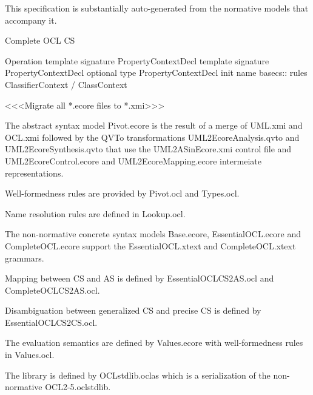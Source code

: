 \label{ocl:ToDo}

This specification is substantially auto-generated from the normative models that accompany it.

Complete OCL CS

Operation template signature
PropertyContextDecl template signature
PropertyContextDecl optional type
PropertyContextDecl init name
basecs:: rules
ClassifierContext / ClassContext



<<<Migrate all *.ecore files to *.xmi>>>


The abstract syntax model Pivot.ecore is the result of a merge of UML.xmi and OCL.xmi followed by the QVTo transformations UML2EcoreAnalysis.qvto and UML2EcoreSynthesis.qvto that use the UML2ASinEcore.xmi control file and UML2EcoreControl.ecore and UML2EcoreMapping.ecore intermeiate representations.

Well-formedness rules are provided by Pivot.ocl and Types.ocl.

Name resolution rules are defined in Lookup.ocl.


The non-normative concrete syntax models Base.ecore, EssentialOCL.ecore and CompleteOCL.ecore support the EssentialOCL.xtext and CompleteOCL.xtext grammars.

Mapping between CS and AS is defined by EssentialOCLCS2AS.ocl and CompleteOCLCS2AS.ocl.

Disambiguation between generalized CS and precise CS is defined by EssentialOCLCS2CS.ocl.


The evaluation semantics are defined by Values.ecore with well-formedness rules in Values.ocl.


The library is defined by OCLstdlib.oclas which is a serialization of the non-normative OCL2-5.oclstdlib.